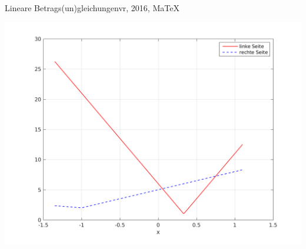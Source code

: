 \begin{MAufgabe}{Lineare Betrags(un)gleichungen}{vr, 2016, MaTeX}
 \begin{center}
 \includegraphics[width=0.8\linewidth]{Abb_zur_Ag_autogenerated_abs_7.png} \end{center}
 
\else\relax\fi
 \end{MAufgabe}